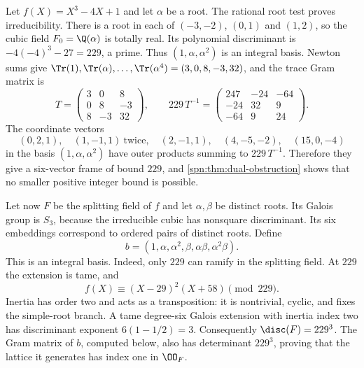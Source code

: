 \begin{example}\label{spn:ex:cubic229}
Let $f(X)=X^3-4X+1$ and let $\alpha$ be a root. The rational root test proves
irreducibility. There is a root in each of $(-3,-2)$, $(0,1)$ and $(1,2)$, so
the cubic field $F_0=\Q(\alpha)$ is totally real. Its polynomial discriminant
is $-4(-4)^3-27=229$, a prime. Thus $(1,\alpha,\alpha^2)$ is an integral
basis. Newton sums give
$\Tr(1),\Tr(\alpha),\dots,\Tr(\alpha^4)=(3,0,8,-3,32)$, and the trace Gram
matrix is
\[
 T=\begin{pmatrix}3&0&8\\0&8&-3\\8&-3&32\end{pmatrix},\qquad
 229\,T^{-1}=\begin{pmatrix}247&-24&-64\\-24&32&9\\-64&9&24\end{pmatrix}.
\]
The coordinate vectors
\[
 (0,2,1),\quad(1,-1,1)\ \text{twice},\quad(2,-1,1),\quad(4,-5,-2),\quad
 (15,0,-4)
\]
in the basis $(1,\alpha,\alpha^2)$ have outer products summing to
$229\,T^{-1}$. Therefore they give a six-vector frame of bound $229$, and
\cref{spn:thm:dual-obstruction} shows that no smaller positive integer bound
is possible.
\end{example}

Let now $F$ be the splitting field of $f$ and let $\alpha,\beta$ be distinct
roots. Its Galois group is $S_3$, because the irreducible cubic has nonsquare
discriminant. Its six embeddings correspond to ordered pairs of distinct
roots. Define
\[
 b=(1,\alpha,\alpha^2,\beta,\alpha\beta,\alpha^2\beta).
\]
This is an integral basis. Indeed, only $229$ can ramify in the splitting
field. At $229$ the extension is tame, and
\[
 f(X)\equiv(X-29)^2(X+58)\pmod{229}.
\]
Inertia has order two and acts as a transposition: it is nontrivial, cyclic,
and fixes the simple-root branch. A tame degree-six Galois extension with
inertia index two has discriminant exponent $6(1-1/2)=3$. Consequently
$\disc(F)=229^3$. The Gram matrix of $b$, computed below, also has determinant
$229^3$, proving that the lattice it generates has index one in $\OO_F$.

